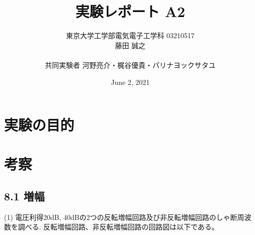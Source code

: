 \documentclass{ltjsarticle}
\title{実験レポート A2}
\author{東京大学工学部電気電子工学科 03210517\\藤田 誠之\\~\\ 共同実験者  河野亮介・梶谷優貴・パリナヨックサタユ}
\date{ June 2, 2021}
\begin{document}
\maketitle

\section{実験の目的}

\section{考察}
\subsection*{8.1 増幅}
(1) 電圧利得20dB, 40dBの2つの反転増幅回路及び非反転増幅回路のしゃ断周波数を調べる. 
反転増幅回路、非反転増幅回路の回路図は以下である。
\end{document}
